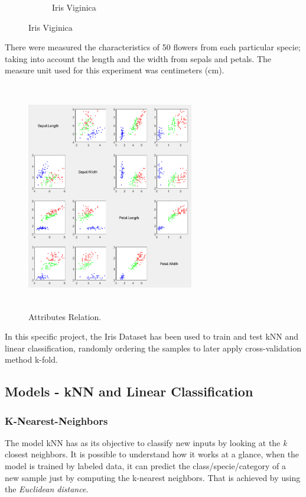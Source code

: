\documentclass[11pt]{article}
\begin{document}
\begin{figure}[H]
\begin{subfigure}{0.32\textwidth}
  \caption{Iris Viginica}
 \end{subfigure}

\end{figure}

There were measured the characteristics of 50 flowers from each particular
specie; taking into account the length and the width from sepals and petals. The
measure unit used for this experiment was centimeters (cm).

\begin{figure}[h]
 \centering
 \includegraphics[width=0.65\textwidth, height=10cm]
                 {../images/characteristics.png}
 \caption{Attributes Relation.}
\end{figure}

In this specific project, the Iris Dataset has been used to train and test kNN
and linear classification, randomly ordering the samples to later apply
cross-validation method k-fold.

\subsection{Models - kNN and Linear Classification}

\subsubsection{K-Nearest-Neighbors}

The model kNN has as its objective to classify new inputs by looking at the
\textit{k} closest neighbors. It is possible to understand how it works at a 
glance, when the model is trained by labeled data, it can predict the
class/specie/category of a new sample just by computing the k-nearest neighbors.
That is achieved by using the \textit{Euclidean distance}.
\end{document}
